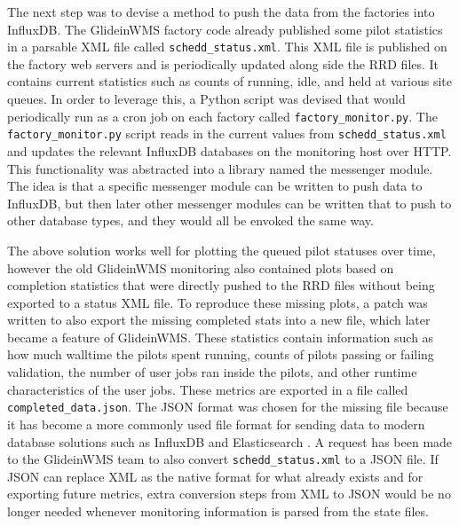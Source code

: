 \documentclass{webofc}
\begin{document}
The next step was to devise a method to push the data from the factories into InfluxDB. The GlideinWMS factory code already published some pilot statistics in a parsable XML file called \verb"schedd_status.xml". This XML file is published on the factory web servers and is periodically updated along side the RRD files. It contains current statistics such as counts of running, idle, and held at various site queues. In order to leverage this, a Python script was devised that would periodically run as a cron job on each factory called \verb"factory_monitor.py". The \verb"factory_monitor.py" script reads in the current values from \verb"schedd_status.xml" and updates the relevant InfluxDB databases on the monitoring host over HTTP. This functionality was abstracted into a library named the messenger module. The idea is that a specific messenger module can be written to push data to InfluxDB, but then later other messenger modules can be written that to push to other database types, and they would all be envoked the same way.

The above solution works well for plotting the queued pilot statuses over time, however the old GlideinWMS monitoring also contained plots based on completion statistics that were directly pushed to the RRD files without being exported to a status XML file. To reproduce these missing plots, a patch was written to also export the missing completed stats into a new file, which later became a feature of GlideinWMS. These statistics contain information such as how much walltime the pilots spent running, counts of pilots passing or failing validation, the number of user jobs ran inside the pilots, and other runtime characteristics of the user jobs. These metrics are exported in a file called \verb"completed_data.json". The JSON format was chosen for the missing file because it has become a more commonly used file format for sending data to modern database solutions such as InfluxDB and Elasticsearch \cite{elasticsearch}. A request has been made to the GlideinWMS team to also convert \verb"schedd_status.xml" to a JSON file. If JSON can replace XML as the native format for what already exists and for exporting future metrics, extra conversion steps from XML to JSON would be no longer needed whenever monitoring information is parsed from the state files.
\end{document}
